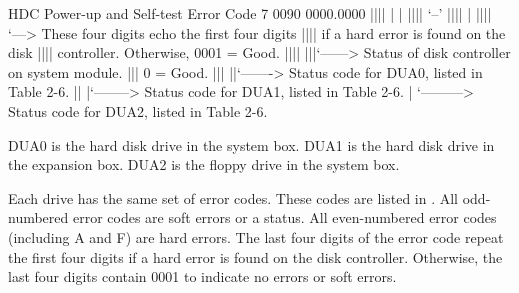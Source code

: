 \begin{ttfig}{HDC Power-up and Self-test Error Code}
7 0090 0000.0000
       |||| |  |
       |||| `--'
       ||||  |
       ||||  `---> These four digits echo the first four digits
       ||||        if a hard error is found on the disk
       ||||        controller. Otherwise, 0001 = Good.
       ||||
       |||`------> Status of disk controller on system module.
       |||         0 = Good.
       |||
       ||`-------> Status code for DUA0, listed in Table 2-6.
       ||
       |`--------> Status code for DUA1, listed in Table 2-6.
       |
       `---------> Status code for DUA2, listed in Table 2-6.

              DUA0 is the hard disk drive in the system box.
              DUA1 is the hard disk drive in the expansion box.
              DUA2 is the floppy drive in the system box.
\end{ttfig}

Each drive has the same set of error codes. These codes are listed in 
. All odd-numbered error codes are soft errors or a status. All 
even-numbered error codes (including A and F) are hard errors. The last four
digits of the error code repeat the first four digits if a hard error is found on
the disk controller. Otherwise, the last four digits contain 0001 to indicate
no errors or soft errors.

